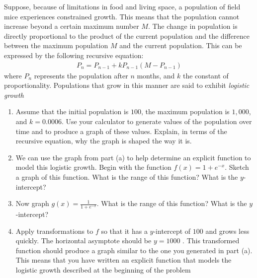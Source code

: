 \documentclass[10pt,]{book}
\theoremstyle{ptxdefinitionnotitle}
\theoremstyle{ptxdefinitiontitle}
\theoremstyle{ptxdefinitionnotitle}
\theoremstyle{ptxdefinitiontitle}
\theoremstyle{ptxdefinitionnotitle}
\theoremstyle{ptxdefinitiontitle}
\numberwithin{equation}{section}
\begin{document}
\begin{divisionexercise}{9}\hypertarget{exercise-70}{}
\hypertarget{p-267}{}%
Suppose, because of limitations in food and living space, a population of field mice experiences constrained growth. This means that the population cannot increase beyond a certain maximum number \(M\).  The change in population is directly proportional to the product of the current population and the difference between the maximum population \(M\) and the current population.  This can be expressed by the following recursive equation:%
%
\begin{gather*}
P_n = P_{n-1} + kP_{n-1} \left( M - P_{n-1} \right)
\end{gather*}
\hypertarget{p-268}{}%
where \(P_n\) represents the population after \(n\) months, and \(k\) the constant of proportionality.  Populations that grow in this manner are said to exhibit \emph{logistic growth}%
\leavevmode%
\begin{enumerate}[label=(\alph*)]
\item\hypertarget{li-155}{}Assume that the initial population is \(100\), the maximum population is \(1,000\), and \(k = 0.0006\).  Use your calculator to generate values of the population over time and to produce a graph of these values.  Explain, in terms of the recursive equation, why the graph is shaped the way it is.%
\item\hypertarget{li-156}{}We can use the graph from part (a) to help determine an explicit function to model this logistic growth.  Begin with the function \(f(x) = 1 + e^{-x}\).  Sketch a graph of this function.  What is the range of this function?  What is the \(y\)-intercept?%
\item\hypertarget{li-157}{}Now graph \(g(x) = \frac{1}{1+e^{-x}}\).  What is the range of this function?  What is the \(y\)-intercept?%
\item\hypertarget{li-158}{}Apply transformations to \(f\) so that it has a \(y\)-intercept of \(100\) and grows less quickly.  The horizontal asymptote should be \(y = 1000\) .  This transformed function should produce a graph similar to the one you generated in part (a). This means that you have written an explicit function that models the logistic growth described at the beginning of the problem%
\end{enumerate}
\end{divisionexercise}%
\end{document}
